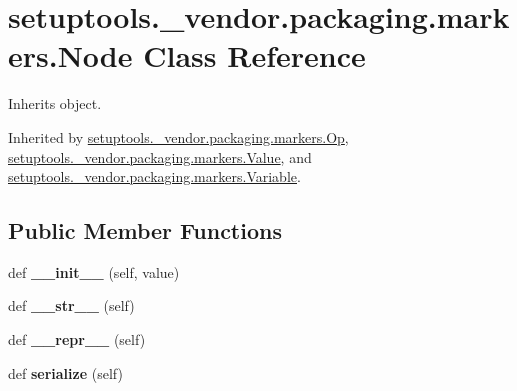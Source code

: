\hypertarget{classsetuptools_1_1__vendor_1_1packaging_1_1markers_1_1_node}{}\section{setuptools.\+\_\+vendor.\+packaging.\+markers.\+Node Class Reference}
\label{classsetuptools_1_1__vendor_1_1packaging_1_1markers_1_1_node}


Inherits object.



Inherited by \hyperlink{classsetuptools_1_1__vendor_1_1packaging_1_1markers_1_1_op}{setuptools.\+\_\+vendor.\+packaging.\+markers.\+Op}, \hyperlink{classsetuptools_1_1__vendor_1_1packaging_1_1markers_1_1_value}{setuptools.\+\_\+vendor.\+packaging.\+markers.\+Value}, and \hyperlink{classsetuptools_1_1__vendor_1_1packaging_1_1markers_1_1_variable}{setuptools.\+\_\+vendor.\+packaging.\+markers.\+Variable}.

\subsection*{Public Member Functions}
\begin{DoxyCompactItemize}
\item 
\mbox{\label{classsetuptools_1_1__vendor_1_1packaging_1_1markers_1_1_node_a37103996372a8c46d988766667be533f}} 
def {\bfseries \+\_\+\+\_\+init\+\_\+\+\_\+} (self, value)
\item 
\mbox{\label{classsetuptools_1_1__vendor_1_1packaging_1_1markers_1_1_node_a0b68ab0418654f21f81deae293c40516}} 
def {\bfseries \+\_\+\+\_\+str\+\_\+\+\_\+} (self)
\item 
\mbox{\label{classsetuptools_1_1__vendor_1_1packaging_1_1markers_1_1_node_ae26672290ba74cf2eda0c89e0527df22}} 
def {\bfseries \+\_\+\+\_\+repr\+\_\+\+\_\+} (self)
\item 
\mbox{\label{classsetuptools_1_1__vendor_1_1packaging_1_1markers_1_1_node_a4684c86e08d0db1fc159e4ec983b3903}} 
def {\bfseries serialize} (self)
\end{DoxyCompactItemize}
